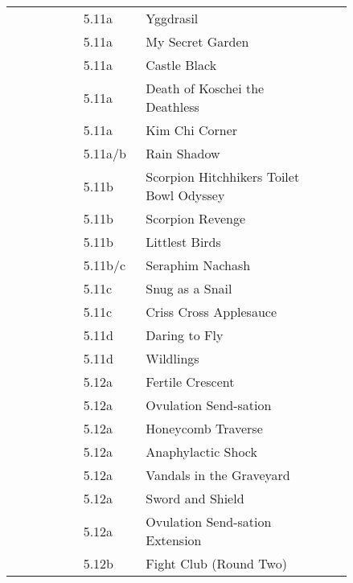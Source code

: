 \begin{flushleft}
\begin{center}
\begin{supertabular}{p{0.18\linewidth}p{0.13\linewidth}p{0.45\linewidth}p{0.08\linewidth}}
&5.11a&Yggdrasil & \pageref{rt:Yggdrasil} \\
&5.11a&My Secret Garden & \pageref{rt:My Secret Garden} \\
&5.11a&Castle Black & \pageref{rt:Castle Black} \\
&5.11a&Death of Koschei the Deathless & \pageref{rt:Death of Koschei the Deathless} \\
&5.11a&Kim Chi Corner & \pageref{rt:Kim Chi Corner} \\
&5.11a/b&Rain Shadow & \pageref{rt:Rain Shadow} \\
&5.11b&Scorpion Hitchhikers Toilet Bowl Odyssey & \pageref{rt:Scorpion Hitchhikers Toilet Bowl Odyssey} \\
&5.11b&Scorpion Revenge & \pageref{rt:Scorpion Revenge} \\
&5.11b&Littlest Birds & \pageref{rt:Littlest Birds} \\
&5.11b/c&Seraphim Nachash & \pageref{rt:Seraphim Nachash} \\
&5.11c&Snug as a Snail & \pageref{rt:Snug as a Snail} \\
&5.11c&Criss Cross Applesauce & \pageref{rt:Criss Cross Applesauce} \\
&5.11d&Daring to Fly & \pageref{rt:Daring to Fly} \\
&5.11d&Wildlings & \pageref{rt:Wildlings} \\
&5.12a&Fertile Crescent & \pageref{rt:Fertile Crescent} \\
&5.12a&Ovulation Send-sation & \pageref{rt:Ovulation Send-sation} \\
&5.12a&Honeycomb Traverse & \pageref{vr:Honeycomb Traverse} \\
&5.12a&Anaphylactic Shock & \pageref{rt:Anaphylactic Shock} \\
&5.12a&Vandals in the Graveyard & \pageref{rt:Vandals in the Graveyard} \\
&5.12a&Sword and Shield & \pageref{rt:Sword and Shield} \\
&5.12a&Ovulation Send-sation Extension & \pageref{vr:Ovulation Send-sation Extension} \\
&5.12b&Fight Club (Round Two) & \pageref{rt:Fight Club (Round Two)} \\

\end{supertabular}
\end{center}
\end{flushleft}
